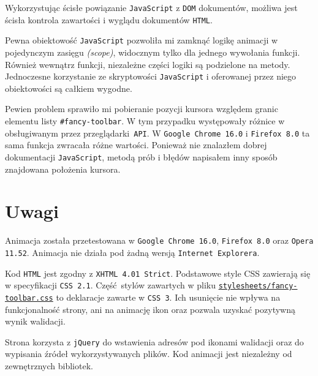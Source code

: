 \documentclass[10pt,a4paper]{article}
\newcommand{\f}[1]{\texttt{#1}}
\begin{document}
Wykorzystując ścisłe powiązanie \f{JavaScript} z \f{DOM} dokumentów, możliwa
jest ścisła kontrola zawartości i wyglądu dokumentów \f{HTML}.

Pewna obiektowość \f{JavaScript} pozwoliła mi zamknąć logikę animacji w
pojedynczym zasięgu \emph{(scope)}, widocznym tylko dla jednego wywołania
funkcji. Również wewnątrz funkcji, niezależne części logiki są podzielone na
metody. Jednoczesne korzystanie ze skryptowości \f{JavaScript} i oferowanej
przez niego obiektowości są całkiem wygodne.

Pewien problem sprawiło mi pobieranie pozycji kursora względem granic elementu
listy \f{\#fancy-toolbar}. W tym przypadku występowały różnice w obsługiwanym
przez przeglądarki \f{API}. W \f{Google Chrome 16.0} i \f{Firefox 8.0} ta sama
funkcja zwracała różne wartości. Ponieważ nie znalazłem dobrej dokumentacji
\f{JavaScript}, metodą prób i błędów napisałem inny sposób znajdowana położenia
kursora.



\section{Uwagi}

Animacja została przetestowana w \f{Google Chrome 16.0}, \f{Firefox 8.0} oraz
\f{Opera 11.52}. Animacja nie działa pod żadną wersją \f{Internet Explorera}. 

Kod \f{HTML} jest zgodny z \f{XHTML 4.01 Strict}. Podstawowe style CSS zawierają
się w specyfikacji \f{CSS 2.1}. Część stylów zawartych w pliku
\href{https://github.com/student-tomasz/pi-cwiczenie-2/tree/b3f54b187e99c161f7a6780524f504c9fd1b00dd/stylesheets/fancy-toolbar.css}{\f{stylesheets/fancy-toolbar.css}}
to deklaracje zawarte w \f{CSS 3}. Ich usunięcie nie wpływa na funkcjonalność
strony, ani na animację ikon oraz pozwala uzyskać pozytywną wynik walidacji.

Strona korzysta z \f{jQuery} do wstawienia adresów pod ikonami walidacji oraz do
wypisania źródeł wykorzystywanych plików. Kod animacji jest niezależny od
zewnętrznych bibliotek.
\end{document}
